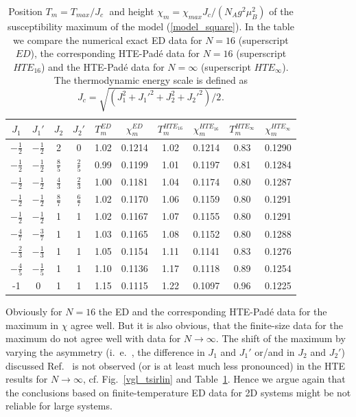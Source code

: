 \documentclass[aps,twocolumn,groupedaddress]{revtex4}
\begin{document}
\begin{table}
\begin{center}
\caption{Position $T_m=T_{max}/J_c\;$ and height
$\chi_m=\chi_{max}J_c/(N_Ag^2\mu_B^2)$
 of the susceptibility maximum of the model
(\ref{model_square}). In the table we compare the numerical exact ED data
for
$N=16$ (superscript $ED$), the corresponding HTE-Pad\'e data for $N=16$
(superscript $HTE_{16}$) and the HTE-Pad\'e
data for $N=\infty$ (superscript $HTE_{\infty}$).
The thermodynamic energy scale is defined as
$J_c=\sqrt{(J_1^2+J_1'^2+J_2^2+J_2'^2)/2}$. \label{table2}
}
\begin{tabular}{|c|c|c|c|c|c|c|c|c|c|}
\hline
$J_1$ & $J_1'$ & $J_2$ & $J_2'$ & $T^{ED}_m$ & $\chi^{ED}_m$ & $T^{HTE_{16}}_m$ & $\chi^{HTE_{16}}_m $  & $T^{HTE_{\infty}}_m$ & $\chi^{HTE_{\infty}}_m$\\
\hline
$-\frac{1}{2}$ & $-\frac{1}{2}$ & 2 & 0 & 1.02 & 0.1214 & 1.02 & 0.1214 & 0.83 & 0.1290\\
$-\frac{1}{2}$ & $-\frac{1}{2}$ & $\frac{8}{5}$ & $\frac{2}{5}$ & 0.99 & 0.1199 & 1.01 & 0.1197 & 0.81 & 0.1284\\
$-\frac{1}{2}$ & $-\frac{1}{2}$ & $\frac{4}{3}$ & $\frac{2}{3}$ & 1.00 & 0.1181 & 1.04 & 0.1174 & 0.80 & 0.1287\\
$-\frac{1}{2}$ & $-\frac{1}{2}$ & $\frac{8}{7}$ & $\frac{6}{7}$ & 1.02 & 0.1170 & 1.06 & 0.1159 & 0.80 & 0.1291\\
$-\frac{1}{2}$ & $-\frac{1}{2}$ & 1 & 1 & 1.02 & 0.1167 & 1.07 & 0.1155 & 0.80 & 0.1291\\
$-\frac{4}{7}$ & $-\frac{3}{7}$ & 1 & 1 & 1.03 & 0.1165 & 1.08 & 0.1152 & 0.80 & 0.1288\\
$-\frac{2}{3}$ & $-\frac{1}{3}$ & 1 & 1 & 1.05 & 0.1154 & 1.11 & 0.1141 & 0.83 & 0.1276\\
$-\frac{4}{5}$ & $-\frac{1}{5}$ & 1 & 1 & 1.10 & 0.1136 & 1.17 & 0.1118 & 0.89 & 0.1254\\
-1 & 0 & 1 & 1 & 1.15 & 0.1115 & 1.22 & 0.1097 & 0.96 & 0.1225\\
\hline
\end{tabular}
\end{center}
\end{table}


Obviously for $N=16$ the ED  and the corresponding HTE-Pad\'e data for the  maximum
in $\chi$ agree well. But it is also obvious, that the finite-size data for
the maximum do not agree well with data for $N \to \infty$.
The shift of the maximum by
varying the asymmetry (i.~e.~, the difference in $J_1$ and $J_1'$ or/and in
$J_2$ and $J_2'$) discussed Ref.~ is not observed (or is at
least much less pronounced) in the   HTE results  for  $N \to \infty$, cf.
Fig.~\ref{vgl_tsirlin} and
Table~\ref{table2}.
Hence we argue again that the conclusions based on finite-temperature ED data for 2D systems
might be not reliable for large systems.
\end{document}
